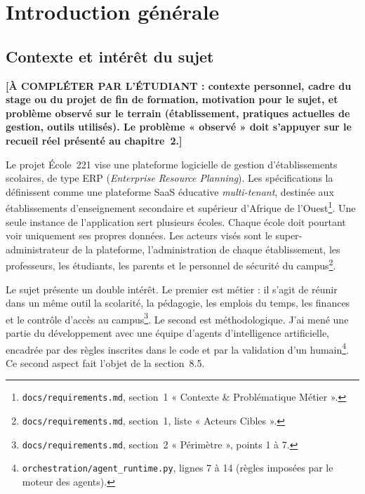 \chapter*{Introduction générale}

\section*{Contexte et intérêt du sujet}

\textbf{[À COMPLÉTER PAR L'ÉTUDIANT : contexte personnel, cadre du stage ou du projet de fin de formation, motivation pour le sujet, et problème observé sur le terrain (établissement, pratiques actuelles de gestion, outils utilisés). Le problème « observé » doit s'appuyer sur le recueil réel présenté au chapitre~2.]}

Le projet École~221 vise une plateforme logicielle de gestion d'établissements scolaires, de type ERP (\emph{Enterprise Resource Planning}). Les spécifications la définissent comme une plateforme SaaS éducative \emph{multi-tenant}, destinée aux établissements d'enseignement secondaire et supérieur d'Afrique de l'Ouest\footnote{\nolinkurl{docs/requirements.md}, section~1 « Contexte \& Problématique Métier ».}. Une seule instance de l'application sert plusieurs écoles. Chaque école doit pourtant voir uniquement ses propres données. Les acteurs visés sont le super-administrateur de la plateforme, l'administration de chaque établissement, les professeurs, les étudiants, les parents et le personnel de sécurité du campus\footnote{\nolinkurl{docs/requirements.md}, section~1, liste « Acteurs Cibles ».}.

Le sujet présente un double intérêt. Le premier est métier : il s'agit de réunir dans un même outil la scolarité, la pédagogie, les emplois du temps, les finances et le contrôle d'accès au campus\footnote{\nolinkurl{docs/requirements.md}, section~2 « Périmètre », points 1 à 7.}. Le second est méthodologique. J'ai mené une partie du développement avec une équipe d'agents d'intelligence artificielle, encadrée par des règles inscrites dans le code et par la validation d'un humain\footnote{\nolinkurl{orchestration/agent_runtime.py}, lignes 7 à 14 (règles imposées par le moteur des agents).}. Ce second aspect fait l'objet de la section~8.5.

